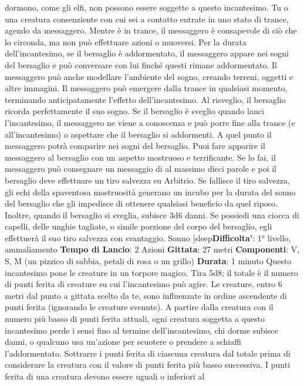\begin{multicols}{2}
dormono, come gli elfi, non possono essere soggette a
questo incantesimo. Tu o una creatura consenziente
con cui sei a contatto entrate in uno stato di trance,
agendo da messaggero. Mentre è in trance, il
messaggero è consapevole di ciò che lo circonda, ma
non può effettuare azioni o muoversi.
Per la durata dell’incantesimo, se il bersaglio è
addormentato, il messaggero appare nei sogni del
bersaglio e può conversare con lui finché questi rimane
addormentato. Il messaggero può anche modellare
l’ambiente del sogno, creando terreni, oggetti e altre
immagini. Il messaggero può emergere dalla trance in
qualsiasi momento, terminando anticipatamente l’effetto
dell’incantesimo. Al risveglio, il bersaglio ricorda
perfettamente il suo sogno. Se il bersaglio è sveglio
quando lanci l’incantesimo, il messaggero ne viene a
conoscenza e può porre fine alla trance (e
all’incantesimo) o aspettare che il bersaglio si
addormenti. A quel punto il messaggero potrà
comparire nei sogni del bersaglio.
Puoi fare apparire il messaggero al bersaglio con un
aspetto mostruoso e terrificante. Se lo fai, il
messaggero può consegnare un messaggio di al
massimo dieci parole e poi il bersaglio deve effettuare
un tiro salvezza su Arbitrio. Se fallisce il tiro
salvezza, gli echi della spaventosa mostruosità
generano un incubo per la durata del sonno del
bersaglio che gli impedisce di ottenere qualsiasi
beneficio da quel riposo. Inoltre, quando il bersaglio si
sveglia, subisce 3d6 danni.
Se possiedi una ciocca di capelli, delle unghie tagliate,
o simile porzione del corpo del bersaglio, egli effettuerà
il suo tiro salvezza con svantaggio.
Sonno
[sleep\textbf{Difficolta'}:
1° livello, ammaliamento
\textbf{Tempo di Lancio}: 2 Azioni
\textbf{Gittata}: 27 metri
\textbf{Componenti}: V, S, M (un pizzico di sabbia, petali di
rosa o un grillo)
\textbf{Durata}: 1 minuto
Questo incantesimo pone le creature in un torpore
magico. Tira 5d8; il totale è il numero di punti ferita di
creature su cui l’incantesimo può agire. Le creature,
entro 6 metri dal punto a gittata scelto da te, sono
influenzate in ordine ascendente di punti ferita
(ignorando le creature svenute).
A partire dalla creatura con il numero più basso di punti
ferita attuali, ogni creatura soggetta a questo
incantesimo perde i sensi fino al termine
dell’incantesimo, chi dorme subisce danni, o qualcuno
usa un’azione per scuotere o prendere a schiaffi
l’addormentato. Sottrarre i punti ferita di ciascuna
creatura dal totale prima di considerare la creatura con
il valore di punti ferita più basso successiva. I punti
ferita di una creatura devono essere uguali o inferiori al

\end{multicols}

